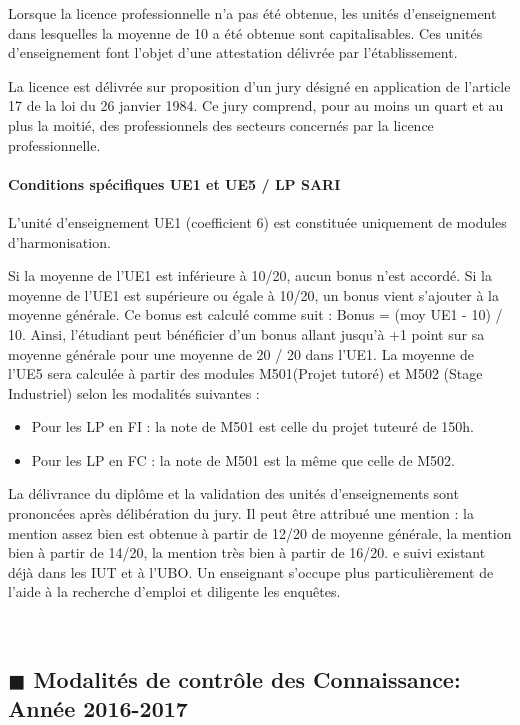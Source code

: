 \documentclass[11pt]{article}
\newcommand{\mysubsection}[1]
{~\\
{\noindent
\begin{minipage}{\linewidth}
\subsection*{$\blacksquare$ #1}
\end{minipage}
}
}
\begin{document}
{{\begin{multicols*}{2}
Lorsque la licence professionnelle n'a pas été obtenue, les unités d'enseignement dans lesquelles la moyenne de 10 a été obtenue sont capitalisables. Ces unités d'enseignement font l'objet d'une attestation délivrée par l'établissement.

La licence est délivrée sur proposition d'un jury désigné en application de l'article 17 de la loi du 26 janvier 1984. Ce jury comprend, pour au moins un quart et au plus la moitié, des professionnels des secteurs concernés par la licence professionnelle.

\paragraph{Conditions spécifiques UE1 et UE5 / LP SARI}

L'unité d'enseignement UE1 (coefficient 6) est constituée uniquement de modules d'harmonisation.

Si la moyenne de l'UE1 est inférieure à 10/20, aucun bonus n'est accordé. Si la moyenne de l'UE1 est supérieure ou égale à 10/20, un bonus vient s'ajouter à la moyenne générale. Ce bonus est calculé comme suit : Bonus = (moy UE1 - 10) / 10. Ainsi, l'étudiant peut bénéficier d'un bonus allant jusqu'à +1 point sur sa moyenne générale pour une moyenne de 20 / 20 dans l'UE1.
La moyenne de l'UE5 sera calculée à partir des modules M501(Projet tutoré) et M502 (Stage Industriel) selon les modalités suivantes :

\begin{itemize}
\item Pour les LP en FI : la note de M501 est celle du projet tuteuré de 150h.
\item Pour les LP en FC : la note de M501 est la même que celle de M502.
\end{itemize}

La délivrance du diplôme et la validation des unités d'enseignements sont prononcées après délibération du jury.
Il peut être attribué une mention : la mention assez bien est obtenue à partir de 12/20 de moyenne générale, la mention bien à partir de 14/20, la mention très bien à partir de 16/20.
e suivi existant déjà dans les IUT et à l'UBO. Un enseignant s'occupe plus particulièrement de l'aide à la recherche d'emploi et diligente les enquêtes.

\end{multicols*}

\newpage

\mysubsection{Modalités de contrôle des Connaissance: Année 2016-2017}

}}
\end{document}
